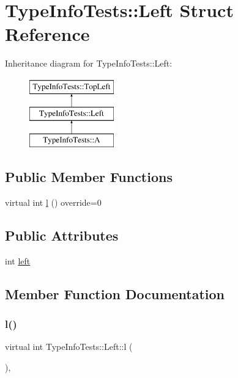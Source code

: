 \hypertarget{structTypeInfoTests_1_1Left}{}\section{Type\+Info\+Tests\+::Left Struct Reference}
\label{structTypeInfoTests_1_1Left}
Inheritance diagram for Type\+Info\+Tests\+::Left\+:\begin{figure}[H]
\begin{center}
\leavevmode
\includegraphics[height=3.000000cm]{structTypeInfoTests_1_1Left}
\end{center}
\end{figure}
\subsection*{Public Member Functions}
\begin{DoxyCompactItemize}
\item 
virtual int \mbox{\hyperlink{structTypeInfoTests_1_1Left_afb4d9ad3c054e9339eb5dd2b18d2f347}{l}} () override=0
\end{DoxyCompactItemize}
\subsection*{Public Attributes}
\begin{DoxyCompactItemize}
\item 
int \mbox{\hyperlink{structTypeInfoTests_1_1Left_ab79f884f182b81959f3ca15f7b922963}{left}}
\end{DoxyCompactItemize}


\subsection{Member Function Documentation}
\mbox{\label{structTypeInfoTests_1_1Left_afb4d9ad3c054e9339eb5dd2b18d2f347}} 
\subsubsection{\texorpdfstring{l()}{l()}}
{\footnotesize\ttfamily virtual int Type\+Info\+Tests\+::\+Left\+::l (\begin{DoxyParamCaption}{ }\end{DoxyParamCaption})\hspace{0.3cm}{\ttfamily [override]}, {}}



